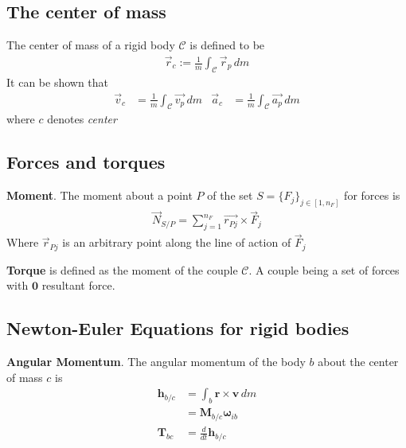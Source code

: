 \subsection{The center of mass} %

The center of mass of a rigid body \(\mathcal{C}\) is defined to be
\begin{align*}
    \vec{r}_c := \frac{1}{m}\int_{\mathcal{C}}\vec{r}_p\,dm
\end{align*}
It can be shown that
\begin{align*}
    \vec{v}_c &= \frac{1}{m}\int_{\mathcal{C}}\vec{v_p}\,dm  &
    \vec{a}_c &= \frac{1}{m}\int_{\mathcal{C}}\vec{a_p}\,dm
\end{align*}
where \(c\) denotes \textit{center}



\setcounter{section}{7}
\setcounter{subsection}{1}
\subsection{Forces and torques} %

\textbf{Moment}. The moment about a point \(P\) of the set \(S = \{F_j\}_{j\in[1,n_F]}\) for forces is
\begin{align*}
    \vec{N}_{S/P} = \sum_{j=1}^{n_F}\vec{r_{Pj}}\times \vec{F}_j
\end{align*}
Where \(\vec{r}_{Pj}\) is an arbitrary point along the line of action of \(\vec{F}_j\)
\newline


\textbf{Torque} is defined as the moment of the couple \(\mathcal{C}\). A couple being a set of forces with \(\bm{0}\) resultant force.
\newline

\subsection{Newton-Euler Equations for rigid bodies} %

\textbf{Angular Momentum}. The angular momentum of the body \(b\) about the center of mass \(c\) is
\begin{align*}
    \bm{h}_{b/c} &= \int_b \bm{r}\times\bm{v} \,dm \\
    &= \bm{M}_{b/c}\bm{\omega}_{ib} \\
    \bm{T}_{bc} &= \frac{d}{dt}\bm{h}_{b/c}
\end{align*}


